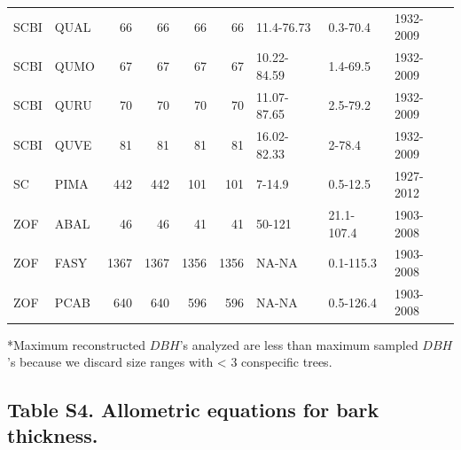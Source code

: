 \documentclass[
]{article}
\begin{document}
\begin{table}[!h]
{\begin{tabular}{llrrrrlll}
\addlinespace
SCBI & QUAL & 66 & 66 & 66 & 66 & 11.4-76.73 & 0.3-70.4 & 1932-2009\\
\addlinespace
SCBI & QUMO & 67 & 67 & 67 & 67 & 10.22-84.59 & 1.4-69.5 & 1932-2009\\
\addlinespace
SCBI & QURU & 70 & 70 & 70 & 70 & 11.07-87.65 & 2.5-79.2 & 1932-2009\\
\addlinespace
SCBI & QUVE & 81 & 81 & 81 & 81 & 16.02-82.33 & 2-78.4 & 1932-2009\\
\addlinespace
SC & PIMA & 442 & 442 & 101 & 101 & 7-14.9 & 0.5-12.5 & 1927-2012\\
\addlinespace
ZOF & ABAL & 46 & 46 & 41 & 41 & 50-121 & 21.1-107.4 & 1903-2008\\
\addlinespace
ZOF & FASY & 1367 & 1367 & 1356 & 1356 & NA-NA & 0.1-115.3 & 1903-2008\\
\addlinespace
ZOF & PCAB & 640 & 640 & 596 & 596 & NA-NA & 0.5-126.4 & 1903-2008\\
\bottomrule
\end{tabular}}
\end{table}

*Maximum reconstructed \(DBH\)'s analyzed are less than maximum sampled
\(DBH\)'s because we discard size ranges with \textless{} 3 conspecific
trees.

\newpage

\hypertarget{table-s4.-allometric-equations-for-bark-thickness.}{%
\subsection{Table S4. Allometric equations for bark
thickness.}\label{table-s4.-allometric-equations-for-bark-thickness.}}
\end{document}
